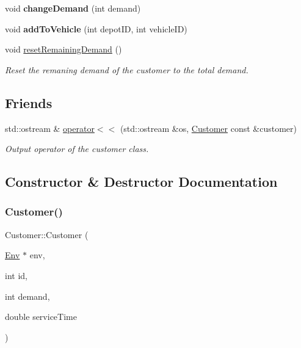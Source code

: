 \begin{DoxyCompactItemize}
void {\bfseries change\+Demand} (int demand)
\item 
\mbox{\label{class_customer_ace23d6d0c410c70f38bc99ac383201b5}} 
void {\bfseries add\+To\+Vehicle} (int depot\+ID, int vehicle\+ID)
\item 
\mbox{\label{class_customer_a0f06bdce903a3efcffe01008183b19bc}} 
void \hyperlink{class_customer_a0f06bdce903a3efcffe01008183b19bc}{reset\+Remaining\+Demand} ()
\begin{DoxyCompactList}\small\item\em Reset the remaning demand of the customer to the total demand. \end{DoxyCompactList}\end{DoxyCompactItemize}
\subsection*{Friends}
\begin{DoxyCompactItemize}
\item 
std\+::ostream \& \hyperlink{class_customer_a3d7eef7f15d078958c6bbd64019e20fa}{operator$<$$<$} (std\+::ostream \&os, \hyperlink{class_customer}{Customer} const \&customer)
\begin{DoxyCompactList}\small\item\em Output operator of the customer class. \end{DoxyCompactList}\end{DoxyCompactItemize}


\subsection{Constructor \& Destructor Documentation}
\mbox{\label{class_customer_aaa83636312ec0431684c8d898a21ad69}} 
\subsubsection{\texorpdfstring{Customer()}{Customer()}}
{\footnotesize\ttfamily Customer\+::\+Customer (\begin{DoxyParamCaption}\item[{\hyperlink{class_env}{Env} $\ast$}]{env,  }\item[{int}]{id,  }\item[{int}]{demand,  }\item[{double}]{service\+Time }\end{DoxyParamCaption})}



